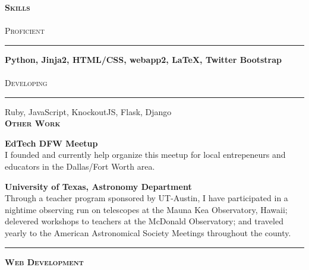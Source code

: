 \documentclass{article}
\begin{document}
\begin{multicols}{2}
\columnbreak


\textsc{\bfseries \Large Skills} \\
\\
\textsc{\large Proficient }
\vspace{4pt} \hrule \vspace{4pt}
{\Large \bfseries Python, Jinja2, HTML/CSS, webapp2, \LaTeX, Twitter Bootstrap} \\
\\
\textsc{\large Developing }
\vspace{4pt} \hrule \vspace{4pt}
{\Large Ruby, JavaScript, KnockoutJS, Flask, Django} \\

\vspace{10pt} 
\textsc{\bfseries \Large Other Work} 
 \vspace{10pt} 

{\bfseries EdTech DFW Meetup } \\
I founded and currently help organize this meetup for local entrepeneurs and educators in the Dallas/Fort Worth area. 
\\
\vspace{10pt}

{\bfseries University of Texas, Astronomy Department} \\
Through a teacher program sponsored by UT-Austin, I have participated in a nightime observing run on telescopes at the Mauna Kea Observatory, Hawaii; delevered workshops to teachers at the McDonald Observatory; and traveled yearly to the American Astronomical Society Meetings throughout the county. 
\\


\end{multicols}

\vspace{10pt} 

\begin{center}
\rule{\textwidth}{4pt}
\end{center}

\textsc{\bfseries \Large Web Development} \\
\end{document}
